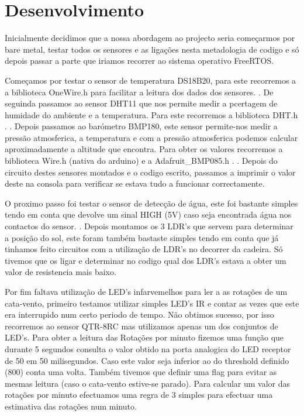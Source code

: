 \documentclass[11pt]{report}
\begin{document}
\chapter*{Desenvolvimento}

Inicialmente decidimos que a nossa abordagem ao projecto seria começarmos por bare metal, testar todos os sensores e as ligações nesta metadologia de codigo e só depois passar a parte que iriamos recorrer ao sistema operativo FreeRTOS. \linebreak

Começamos por testar o sensor de temperatura DS18B20, para este recorremos a a biblioteca OneWire.h \cite{OneWire} para facilitar a leitura dos dados dos sensores. \cite{WaterproofDS18B20} \cite{sparkfunDS18B20}. De seguinda passamos ao sensor DHT11 que nos permite medir a pcertagem de humidade do ambiente e a temperatura. Para este recorremos a biblioteca DHT.h \cite{DHTadafruit}. \cite{DHT}. Depois passamos ao barómetro BMP180, este sensor permite-nos medir a pressão atmosferica, a temperatura e com a pressão atmosferica podemos calcular aproximadamente a altitude que encontra.  Para obter os valores recorremos a biblioteca  Wire.h  (nativa do arduino) e a  Adafruit\_BMP085.h \cite{bmpBiblio}. \cite{bmp}. Depois do circuito destes sensores montados e o codigo escrito, passamos a imprimir o valor deste na consola para verificar se estava tudo a funcionar correctamente. \linebreak

O proximo passo foi testar o sensor de detecção de água, este foi bastante simples tendo em conta que devolve um sinal HIGH (5V) caso seja encontrada água nos contactos do sensor. \cite{water}. Depois montamos os 3 LDR's que servem para determinar a posição do sol, este foram também bastaste simples tendo em conta que já tinhamos feito circuitos com a utilização de LDR's no decorrer da cadeira. Só tivemos que os ligar e determinar no codigo qual dos LDR's estava a obter um valor de resistencia mais baixo. \linebreak

Por fim faltava utilização de LED's infarvemelhos para ler a as rotações de um cata-vento, primeiro testamos utilizar simples LED's IR e contar as vezes que este era interrupido num certo periodo de tempo. Não obtimos sucesso, por isso recorremos ao sensor QTR-8RC mas utilizamos apenas um dos conjuntos de LED's. Para obter a leitura das Rotações por minuto fizemos uma função que durante 5 segundos consulta o valor obtido na porta analogica do LED receptor de 50 em 50 milisegundos. Caso este valor seja inferior ao do threshold definido (800) conta uma volta. Também tivemos que definir uma flag para evitar as mesmas leitura (caso o cata-vento estive-se parado). Para calcular um valor das rotações por minuto efectuamos uma regra de 3 simples para efectuar uma estimativa das rotações num minuto. \pagebreak
\end{document}
